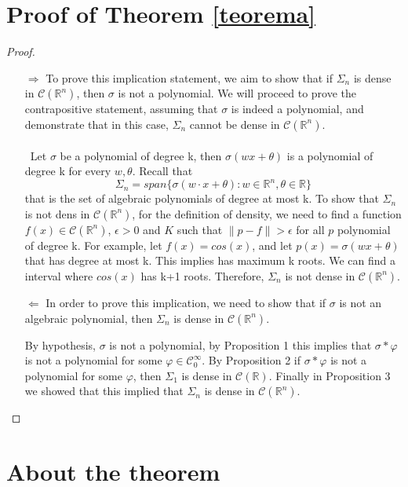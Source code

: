 \documentclass[../main.tex]{subfiles}
\begin{document}
\section{Proof of Theorem \ref{teorema}}
	\begin{proof}~ %

	\begin{enumerate}
		\item[$\Rightarrow$] 
		To prove this implication statement, we aim to show that if $\Sigma_n$ is dense in $\mathcal{C}(\mathbb{R}^n)$, then $\sigma$ is not a polynomial.
		 We will proceed to prove the contrapositive statement, assuming that $\sigma$ is indeed a polynomial, and demonstrate that in this case, $\Sigma_n$ cannot be dense in $\mathcal{C}(\mathbb{R}^n)$. \\ \\ Let $\sigma$ be a polynomial of degree k, then $\sigma(wx+\theta)$ is a polynomial  of degree k for every $w,\theta$. Recall that $$ \Sigma_n = span\{\sigma(w\cdot x + \theta) : w\in \mathbb{R}^n, \theta \in \mathbb{R} \}$$  that is the set of algebraic polynomials of degree at most k. To show that $\Sigma_n$ is not dens in $\mathcal{C}(\mathbb{R}^n)$, for the definition of density, we need to find a function $f(x)\in \mathcal{C}(\mathbb{R}^n)$, $\epsilon > 0$ and $K$ such that  $\| p-f \| > \epsilon$ for all $p$ polynomial of degree k. For example, let $f(x)=cos(x)$, and let $p(x)= \sigma(wx+\theta)$ that has degree at most k. This implies has maximum k roots. We can find a interval where $cos(x)$ has k+1 roots. Therefore, $\Sigma_n$ is not dense in $\mathcal{C}(\mathbb{R}^n)$. 

		\item[$\Leftarrow$]  In order to prove this implication, we need to show that if $\sigma$ is not an algebraic polynomial, then $\Sigma_n$ is dense in $\mathcal{C}(\mathbb{R}^n)$.
		
		
		 By hypothesis, $\sigma$ is not a polynomial, by Proposition 1 this implies that $\sigma \ast \varphi$ is not a polynomial for some $\varphi \in \mathcal{C}_0^\infty$. By Proposition 2 if $\sigma \ast \varphi$ is not a polynomial for some $\varphi$, then $\Sigma_1$ is dense in $\mathcal{C}(\mathbb{R})$. Finally in Proposition 3 we showed that this implied that $\Sigma_n$ is dense in $\mathcal{C}(\mathbb{R}^n).$
		 
	\end{enumerate}
\end{proof}


\section{About the theorem}
\end{document}
